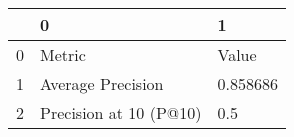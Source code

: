 \begin{tabular}{lll}
\toprule
{} &                       0 &         1 \\
\midrule
0 &                  Metric &     Value \\
1 &       Average Precision &  0.858686 \\
2 &  Precision at 10 (P@10) &       0.5 \\
\bottomrule
\end{tabular}
